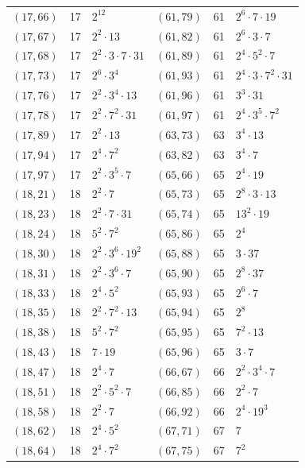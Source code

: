 \documentclass[11pt]{article}
\begin{document}
\begin{longtable}{@{}lrl@{\qquad}lrl@{}}
$(17,66)$ & 17 & $2^{12}$ & $(61,79)$ & 61 & $2^{6}\cdot 7\cdot 19$\\
$(17,67)$ & 17 & $2^{2}\cdot 13$ & $(61,82)$ & 61 & $2^{6}\cdot 3\cdot 7$\\
$(17,68)$ & 17 & $2^{2}\cdot 3\cdot 7\cdot 31$ & $(61,89)$ & 61 & $2^{4}\cdot 5^{2}\cdot 7$\\
$(17,73)$ & 17 & $2^{6}\cdot 3^{4}$ & $(61,93)$ & 61 & $2^{4}\cdot 3\cdot 7^{2}\cdot 31$\\
$(17,76)$ & 17 & $2^{2}\cdot 3^{4}\cdot 13$ & $(61,96)$ & 61 & $3^{3}\cdot 31$\\
$(17,78)$ & 17 & $2^{2}\cdot 7^{2}\cdot 31$ & $(61,97)$ & 61 & $2^{4}\cdot 3^{5}\cdot 7^{2}$\\
$(17,89)$ & 17 & $2^{2}\cdot 13$ & $(63,73)$ & 63 & $3^{4}\cdot 13$\\
$(17,94)$ & 17 & $2^{4}\cdot 7^{2}$ & $(63,82)$ & 63 & $3^{4}\cdot 7$\\
$(17,97)$ & 17 & $2^{2}\cdot 3^{5}\cdot 7$ & $(65,66)$ & 65 & $2^{4}\cdot 19$\\
$(18,21)$ & 18 & $2^{2}\cdot 7$ & $(65,73)$ & 65 & $2^{8}\cdot 3\cdot 13$\\
$(18,23)$ & 18 & $2^{2}\cdot 7\cdot 31$ & $(65,74)$ & 65 & $13^{2}\cdot 19$\\
$(18,24)$ & 18 & $5^{2}\cdot 7^{2}$ & $(65,86)$ & 65 & $2^{4}$\\
$(18,30)$ & 18 & $2^{2}\cdot 3^{6}\cdot 19^{2}$ & $(65,88)$ & 65 & $3\cdot 37$\\
$(18,31)$ & 18 & $2^{2}\cdot 3^{6}\cdot 7$ & $(65,90)$ & 65 & $2^{8}\cdot 37$\\
$(18,33)$ & 18 & $2^{4}\cdot 5^{2}$ & $(65,93)$ & 65 & $2^{6}\cdot 7$\\
$(18,35)$ & 18 & $2^{2}\cdot 7^{2}\cdot 13$ & $(65,94)$ & 65 & $2^{8}$\\
$(18,38)$ & 18 & $5^{2}\cdot 7^{2}$ & $(65,95)$ & 65 & $7^{2}\cdot 13$\\
$(18,43)$ & 18 & $7\cdot 19$ & $(65,96)$ & 65 & $3\cdot 7$\\
$(18,47)$ & 18 & $2^{4}\cdot 7$ & $(66,67)$ & 66 & $2^{2}\cdot 3^{4}\cdot 7$\\
$(18,51)$ & 18 & $2^{2}\cdot 5^{2}\cdot 7$ & $(66,85)$ & 66 & $2^{2}\cdot 7$\\
$(18,58)$ & 18 & $2^{2}\cdot 7$ & $(66,92)$ & 66 & $2^{4}\cdot 19^{3}$\\
$(18,62)$ & 18 & $2^{4}\cdot 5^{2}$ & $(67,71)$ & 67 & $7$\\
$(18,64)$ & 18 & $2^{4}\cdot 7^{2}$ & $(67,75)$ & 67 & $7^{2}$\\

\end{longtable}
\end{document}
